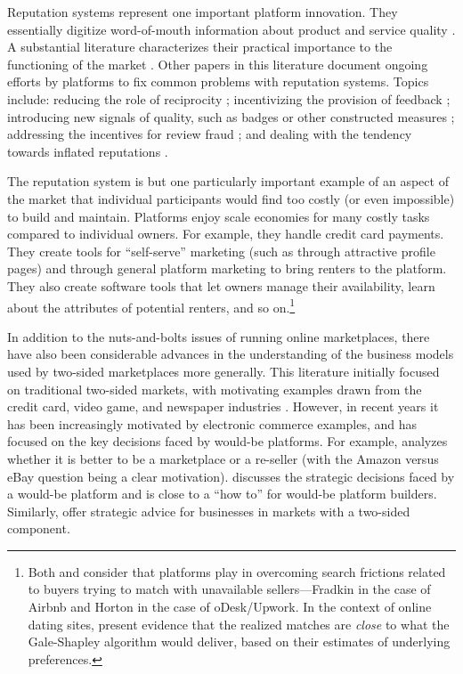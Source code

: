 \documentclass[12pt]{article}
\begin{document}
Reputation systems represent one important platform innovation. 
They essentially digitize word-of-mouth information about product and service quality \citep{dellarocas2003digitization}. 
A substantial literature characterizes their practical importance to the functioning of the market \citep{cabral2010dynamics, resnick2000reputation, resnick2002trust, moreno2014}.
Other papers in this literature document ongoing efforts by platforms to fix common problems with reputation systems.
Topics include: reducing the role of reciprocity \citep{bolton2013engineering};
incentivizing the provision of feedback \citep{fradkin2015bias}; 
introducing new signals of quality, such as badges or other constructed measures \citep{hui2014lemon, nosko2015limits};
addressing the incentives for review fraud \citep{luca2016fake}; 
and dealing with the tendency towards inflated reputations \citep{horton2015reputation}.  

The reputation system is but one particularly important example of an aspect of the market that individual participants would find too costly (or even impossible) to build and maintain. 
Platforms enjoy scale economies for many costly tasks compared to individual owners. 
For example, they handle credit card payments. 
They create tools for ``self-serve'' marketing (such as through attractive profile pages) and through general platform marketing to bring renters to the platform. 
They also create software tools that let owners manage their availability, learn about the attributes of potential renters, and so on.\footnote{
  Both \cite{horton2014misdirected} and \cite{fradkin2013search} consider that platforms play in overcoming search frictions related to buyers trying to match with unavailable sellers---Fradkin in the case of Airbnb and Horton in the case of oDesk/Upwork.
  In the context of online dating sites, \cite{hitsch2010matching} present evidence that the realized matches are \emph{close} to what the Gale-Shapley algorithm would deliver, based on their estimates of underlying preferences.
}

In addition to the nuts-and-bolts issues of running online marketplaces, there have also been considerable advances in the understanding of the business models used by two-sided marketplaces more generally. 
This literature initially focused on traditional two-sided markets, with motivating examples drawn from the credit card, video game, and  newspaper industries \citep{rochet2003platform, rochet2006two, parker2005two}. 
However, in recent years it has been increasingly motivated by electronic commerce examples, and has focused on the key decisions faced by would-be platforms.
For example, \cite{hagiu2014marketplace} analyzes whether it is better to be a marketplace or a re-seller (with the Amazon versus eBay question being a clear motivation).
\cite{hagiu2014strategic} discusses the strategic decisions faced by a would-be platform and is close to a ``how to'' for would-be platform builders.
Similarly, \cite{eisenmann2006strategies} offer strategic advice for businesses in markets with a two-sided component.  
\end{document}
